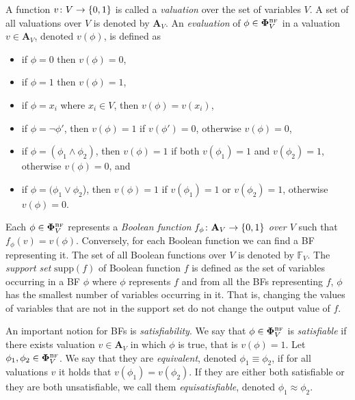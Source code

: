 \documentclass[
  digital, %
  twoside, %
  table,   %
  nolof,     %
  nolot,     %
]{fithesis3}
\let\setbuilder\set
\newcommand{\simpleset}[1]{\{{#1}\}}
\renewcommand{\set}[1]{\normalexpandarg\IfSubStr{#1}{|}{\setbuilder{#1}}{\simpleset{#1}}}
\theoremstyle{definition}
\theoremstyle{remark}
\newcommand{\BF}[1]{\mathbf{\Phi}_{#1}^{\normalfont{\text{\tiny BF}}}}
\newcommand{\valtns}[1]{\mathbf{A}_{#1}}
\newcommand{\BFuncs}[1]{\mathbb{F}_{#1}}
\newcommand{\supp}[1]{\mathrm{supp}(#1)}
\begin{document}
A function $v\colon V \to \set{0,1}$ is called a \emph{valuation} over the set of variables $V$. A set of all valuations over $V$ is denoted by $\valtns{V}$. An \emph{evaluation} of $\phi \in \BF{V}$ in a valuation $v \in \valtns{V}$, denoted $v(\phi)$, is defined as %
\begin{itemize}
    \item if $\phi = 0$ then $v(\phi) = 0$,
    \item if $\phi = 1$ then $v(\phi) = 1$,
    \item if $\phi = x_i$ where $x_i \in V$, then $v(\phi) = v(x_i)$,
    \item if $\phi = \neg\phi'$, then $v(\phi) = 1$ if $v(\phi') = 0$, otherwise $v(\phi) = 0$,
    \item if $\phi = (\phi_1 \land \phi_2)$, then $v(\phi) = 1$ if both $v(\phi_1) = 1$ and $v(\phi_2) = 1$, otherwise $v(\phi) = 0$, and
    \item if $\phi = (\phi_1 \lor \phi_2$), then $v(\phi) = 1$ if $v(\phi_1) = 1$ or $v(\phi_2) = 1$, otherwise $v(\phi) = 0$.
\end{itemize}
Each $\phi \in \BF{V}$ represents a \emph{Boolean function} $f_{\phi}\colon \valtns{V} \to \set{0,1}$ \emph{over $V$} such that $f_{\phi}(v) = v(\phi)$. Conversely, for each Boolean function we can find a BF representing it. The set of all Boolean functions over $V$ is denoted by $\BFuncs{V}$. The \emph{support set} $\supp{f}$ of Boolean function $f$ is defined as the set of variables occurring in a BF $\phi$ where $\phi$ represents $f$ and from all the BFs representing $f$, $\phi$ has the smallest number of variables occurring in it. That is, changing the values of variables that are not in the support set do not change the output value of $f$.


An important notion for BFs is \emph{satisfiability}. We say that $\phi \in \BF{V}$ is \emph{satisfiable} if there exists valuation $v \in \valtns{V}$ in which $\phi$ is true, that is $v(\phi) = 1$. Let $\phi_1, \phi_2 \in \BF{V}$. We say that they are \emph{equivalent}, denoted $\phi_1 \equiv \phi_2$, if for all valuations $v$ it holds that $v(\phi_1) = v(\phi_2)$. If they are either both satisfiable or they are both unsatisfiable, we call them \emph{equisatisfiable}, denoted $\phi_1 \approx \phi_2$.
\end{document}
